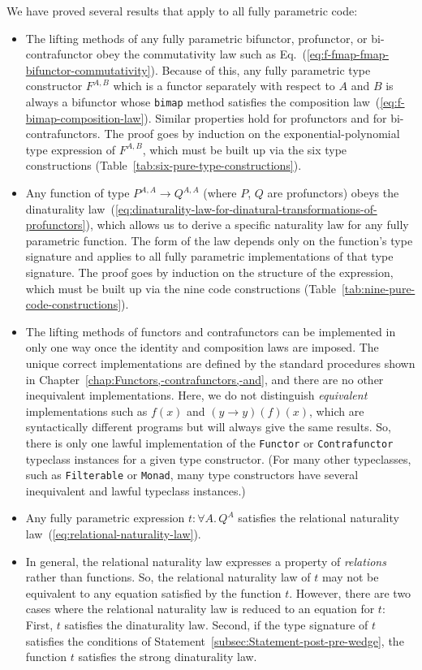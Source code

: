 We have proved several results that apply to all fully parametric
code:
\begin{itemize}
\item The lifting methods of any fully parametric bifunctor, profunctor,
or bi-contrafunctor obey the commutativity law such as Eq.~(\ref{eq:f-fmap-fmap-bifunctor-commutativity}).
Because of this, any fully parametric type constructor $F^{A,B}$
which is a functor separately with respect to $A$ and $B$ is always
a bifunctor whose \lstinline!bimap! method satisfies the composition
law~(\ref{eq:f-bimap-composition-law}). Similar properties hold
for profunctors and for bi-contrafunctors. The proof goes by induction
on the exponential-polynomial type expression of $F^{A,B}$, which
must be built up via the six type constructions (Table~\ref{tab:six-pure-type-constructions}).
\item Any function of type $P^{A,A}\rightarrow Q^{A,A}$ (where $P$, $Q$
are profunctors) obeys the dinaturality law~(\ref{eq:dinaturality-law-for-dinatural-transformations-of-profunctors}),
which allows us to derive a specific naturality law for any fully
parametric function. The form of the law depends only on the function\textsf{'}s
type signature and applies to all fully parametric implementations
of that type signature. The proof goes by induction on the structure
of the expression, which must be built up via the nine code constructions
(Table~\ref{tab:nine-pure-code-constructions}).
\item The lifting methods of functors and contrafunctors can be implemented
in only one way once the identity and composition laws are imposed.
The unique correct implementations are defined by the standard procedures
shown in Chapter~\ref{chap:Functors,-contrafunctors,-and}, and there
are no other inequivalent implementations. Here, we do not distinguish
\emph{equivalent} implementations such as $f(x)$ and $(y\rightarrow y)(f)(x)$,
which are syntactically different programs but will always give the
same results. So, there is only one lawful implementation of the \lstinline!Functor!
or \lstinline!Contrafunctor! typeclass instances for a given type
constructor. (For many other typeclasses, such as \lstinline!Filterable!
or \lstinline!Monad!, many type constructors have several inequivalent
and lawful typeclass instances.)
\item Any fully parametric expression $t:\forall A.\,Q^{A}$ satisfies the
relational naturality law~(\ref{eq:relational-naturality-law}). 
\item In general, the relational naturality law expresses a property of
\emph{relations} rather than functions. So, the relational naturality
law of $t$ may not be equivalent to any equation satisfied by the
function $t$. However, there are two cases where the relational naturality
law is reduced to an equation for $t$: First, $t$ satisfies the
dinaturality law. Second, if the type signature of $t$ satisfies
the conditions of Statement~\ref{subsec:Statement-post-pre-wedge},
the function $t$ satisfies the strong dinaturality law.
\end{itemize}
